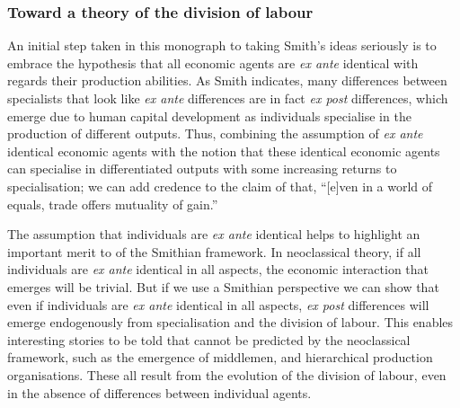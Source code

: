

\subsubsection{Toward a theory of the division of labour}

An initial step taken in this monograph to taking Smith's ideas seriously is to embrace the hypothesis that all economic agents are \textit{ex ante} identical with regards their production abilities. As Smith indicates, many differences between specialists that look like \textit{ex ante} differences are in fact \textit{ex post} differences, which emerge due to human capital development as individuals specialise in the production of different outputs. Thus, combining the assumption of \textit{ex ante} identical economic agents with the notion that these identical economic agents can specialise in differentiated outputs with some increasing returns to specialisation; we can add credence to the claim of \citet[p.~43]{BuchananYoon2000} that, ``[e]ven in a world of equals, trade offers mutuality of gain.''

The assumption that individuals are \textit{ex ante} identical helps to highlight an important merit to of the Smithian framework. In neoclassical theory, if all individuals are \textit{ex ante} identical in all aspects, the economic interaction that emerges will be trivial. But if we use a Smithian perspective we can show that even if individuals are \textit{ex ante} identical in all aspects, \textit{ex post} differences will emerge endogenously from specialisation and the division of labour. This enables interesting stories to be told that cannot be predicted by the neoclassical framework, such as the emergence of middlemen, and hierarchical production organisations. These all result from the evolution of the division of labour, even in the absence of differences between individual agents.

